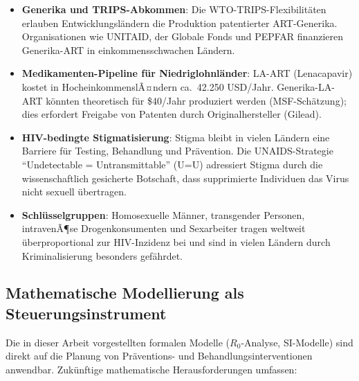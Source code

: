 ﻿\documentclass[a4paper,12pt]{article}
\theoremstyle{definition}
\begin{document}
\begin{itemize}
\item \textbf{Generika und TRIPS-Abkommen}: Die WTO-TRIPS-Flexibilit\"aten erlauben
      Entwicklungsl\"andern die Produktion patentierter ART-Generika. Organisationen
      wie UNITAID, der Globale Fonds und PEPFAR finanzieren Generika-ART in
      einkommensschwachen L\"andern.

\item \textbf{Medikamenten-Pipeline f\"ur Niedriglohnl\"ander}: LA-ART (Lenacapavir)
      kostet in HocheinkommenslÃ¤ndern ca.\ 42.250 USD/Jahr. Generika-LA-ART
      k\"onnten theoretisch f\"ur \$40/Jahr produziert werden (MSF-Sch\"atzung);
      dies erfordert Freigabe von Patenten durch Originalhersteller (Gilead).

\item \textbf{HIV-bedingte Stigmatisierung}: Stigma bleibt in vielen L\"andern
      eine Barriere f\"ur Testing, Behandlung und Pr\"avention.
      Die UNAIDS-Strategie ``Undetectable = Untransmittable'' (U=U) adressiert
      Stigma durch die wissenschaftlich gesicherte Botschaft, dass supprimierte
      Individuen das Virus nicht sexuell \"ubertragen.

\item \textbf{Schl\"usselgruppen}: Homosexuelle M\"anner, transgender Personen,
      intravenÃ¶se Drogenkonsumenten und Sexarbeiter tragen weltweit
      \"uberproportional zur HIV-Inzidenz bei und sind in vielen L\"andern
      durch Kriminalisierung besonders gef\"ahrdet.
\end{itemize}

\subsection{Mathematische Modellierung als Steuerungsinstrument}

Die in dieser Arbeit vorgestellten formalen Modelle ($R_0$-Analyse, SI-Modelle)
sind direkt auf die Planung von Pr\"aventions- und Behandlungsinterventionen
anwendbar. Zuk\"unftige mathematische Herausforderungen umfassen:
\end{document}
